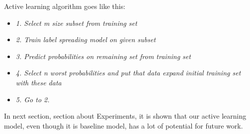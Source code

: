 \documentclass[10pt, a4paper]{article}
\begin{document}
Active learning algorithm goes like this:
\begin{itemize}
	\item \textit{1. Select m size subset from training set}
	\item \textit{2. Train label spreading model on given subset}
	\item \textit{3. Predict probabilities on remaining set from training set}
	\item \textit{4. Select n worst probabilities and put that data expand initial training set with these data}
	\item \textit{5. Go to 2.}
\end{itemize}

In next section, section about Experiments, it is shown that our active learning model, even though it is baseline model, has a lot of potential for future work.
\end{document}
